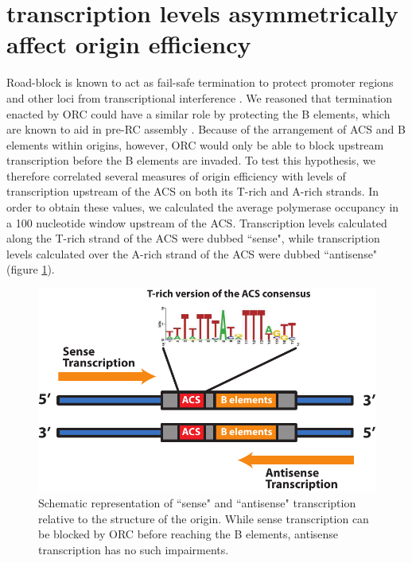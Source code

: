 \section{transcription levels asymmetrically affect origin efficiency}

Road-block is known to act as fail-safe termination to protect promoter regions and other loci from transcriptional interference \cite{colin:2014:roadblock}. 
We reasoned that termination enacted by ORC could have a similar role by protecting the B elements, which are known to aid in pre-RC assembly \cite{wilmes:2002:b2}. 
Because of the arrangement of ACS and B elements within origins, however, ORC would only be able to block upstream transcription before the B elements are invaded. To test this hypothesis, we therefore correlated several measures of origin efficiency with levels of transcription upstream of the ACS on both its T-rich and A-rich strands. In order to obtain these values, we calculated the average polymerase occupancy in a 100 nucleotide window upstream of the ACS. Transcription levels calculated along the T-rich strand of the ACS were dubbed ``sense", while transcription levels calculated over the A-rich strand of the ACS were dubbed ``antisense" (figure \ref{fig:senseAntisense}).

\begin{figure}[h]

\centering
\includegraphics[width=\textwidth]{figures/results/senseAntisenseSchema}
\caption[Cartoon of sense and antisense transcription relative to the ACS]{Schematic representation of ``sense" and ``antisense" transcription relative to the structure of the origin. While sense transcription can be blocked by ORC before reaching the B elements, antisense transcription has no such impairments.}
\label{fig:senseAntisense}

\end{figure}  

